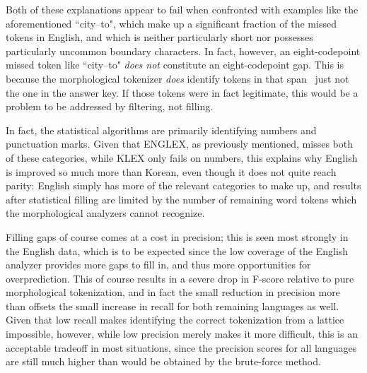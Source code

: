 Both of these explanations appear to fail when confronted with examples like the aforementioned ``city--to", which make up a significant fraction of the missed tokens in English, and which is neither particularly short nor possesses particularly uncommon boundary characters. In fact, however, an eight-codepoint missed token like ``city--to" \textit{does not} constitute an eight-codepoint gap. This is because the morphological tokenizer \textit{does} identify tokens in that span\textemdash~ just not the one in the answer key. If those tokens were in fact legitimate, this would be a problem to be addressed by filtering, not filling.

In fact, the statistical algorithms are primarily identifying numbers and punctuation marks. Given that ENGLEX, as previously mentioned, misses both of these categories, while KLEX only fails on numbers, this explains why English is improved so much more than Korean, even though it does not quite reach parity: English simply has more of the relevant categories to make up, and results after statistical filling are limited by the number of remaining word tokens which the morphological analyzers cannot recognize.

Filling gaps of course comes at a cost in precision; this is seen most strongly in the English data, which is to be expected since the low coverage of the English analyzer provides more gaps to fill in, and thus more opportunities for overprediction. This of course results in a severe drop in F-score relative to pure morphological tokenization, and in fact the small reduction in precision more than offsets the small increase in recall for both remaining languages as well. Given that low recall makes identifying the correct tokenization from a lattice impossible, however, while low precision merely makes it more difficult, this is an acceptable tradeoff in most situations, since the precision scores for all languages are still much higher than would be obtained by the brute-force method.

